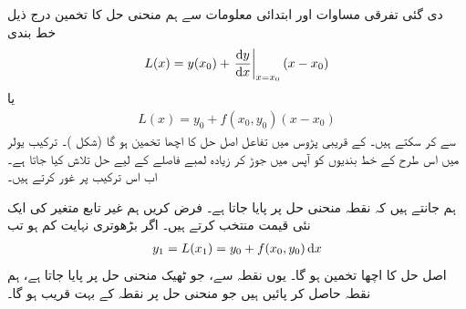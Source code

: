 دی گئی تفرقی مساوات  اور ابتدائی معلومات  سے ہم منحنی حل  کا تخمین درج ذیل خط بندی
\begin{align*}
L(x)=y(x_0)+\left.\frac{\dif y}{\dif x}\right\vert_{x=x_0} (x-x_0)
\end{align*}
یا
\begin{align*}
L(x)=y_0+f(x_0,y_0)(x-x_0)
\end{align*}
سے  کر سکتے ہیں۔  کے   قریبی پڑوس میں تفاعل  اصل حل  کا   اچھا تخمین ہو گا (شکل )۔ ترکیب یولر میں اس طرح کے خط بندیوں کو آپس میں جوڑ کر زیادہ لمبے فاصلے کے لیے حل تلاش کیا جاتا ہے۔ اب اس ترکیب پر غور کرتے ہیں۔

ہم جانتے ہیں کہ نقطہ  منحنی حل پر پایا جاتا ہے۔ فرض کریں ہم غیر تابع متغیر کی ایک نئی قیمت  منتخب کرتے ہیں۔  اگر بڑھوتری  نہایت  کم ہو تب
\begin{align*}
y_1=L(x_1)=y_0+f(x_0,y_0)\dif x
\end{align*}
اصل حل  کا اچھا تخمین ہو گا۔ یوں نقطہ  سے، جو ٹھیک منحنی حل پر پایا جاتا ہے، ہم نقطہ  حاصل کر پائیں ہیں جو منحنی حل پر نقطہ  کے بہت قریب ہو گا۔


